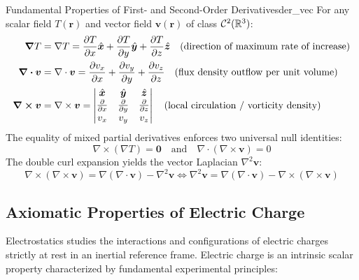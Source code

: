 \begin{proposition}{Fundamental Properties of First- and Second-Order Derivatives}{der_vec}
For any scalar field $T(\bm{r})$ and vector field $\bm{v}(\bm{r})$ of class $\mathcal{C}^2(\mathbb{R}^3)$:
\begin{align}
    \grad T &= \nabla T = \pdv{T}{x}\hat{\bm{x}} + \pdv{T}{y}\hat{\bm{y}} + \pdv{T}{z}\hat{\bm{z}} \quad \text{(direction of maximum rate of increase)} \\
    \div \bm{v} &= \nabla \cdot \bm{v} = \pdv{v_x}{x} + \pdv{v_y}{y} + \pdv{v_z}{z} \quad \text{(flux density outflow per unit volume)} \\
    \curl \bm{v} &= \nabla \times \bm{v} = \begin{vmatrix} \hat{\bm{x}} & \hat{\bm{y}} & \hat{\bm{z}} \\ \pdv{x} & \pdv{y} & \pdv{z} \\ v_x & v_y & v_z \end{vmatrix} \quad \text{(local circulation / vorticity density)}
\end{align}
The equality of mixed partial derivatives enforces two universal null identities:
\begin{equation}
    \nabla \times (\nabla T) = \bm{0} \quad \text{and} \quad \nabla \cdot (\nabla \times \bm{v}) = 0
\end{equation}
The double curl expansion yields the vector Laplacian $\nabla^2\bm{v}$:
\begin{equation}
    \nabla \times (\nabla \times \bm{v}) = \nabla(\nabla \cdot \bm{v}) - \nabla^2\bm{v} \iff \nabla^2\bm{v} = \nabla(\nabla \cdot \bm{v}) - \nabla \times (\nabla \times \bm{v})
\end{equation}
\end{proposition}

\subsection[Axiomatic Properties of Electric Charge]{Axiomatic Properties of Electric Charge}

Electrostatics studies the interactions and configurations of electric charges strictly at rest in an inertial reference frame. Electric charge is an intrinsic scalar property characterized by fundamental experimental principles:

